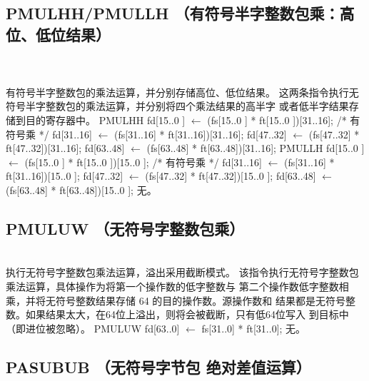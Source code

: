 \subsection{PMULHH/PMULLH （有符号半字整数包乘：高位、低位结果）}

\begin{instructionblk}
   \\
   \\
  {有符号半字整数包的乘法运算，并分别存储高位、低位结果。}
  {这两条指令执行无符号半字整数包的乘法运算，并分别将四个乘法结果的高半字
  或者低半字结果存储到目的寄存器中。}
  {PMULHH \narrownewline
  fd[15..0 ] $\leftarrow$ (fs[15..0 ] * ft[15..0 ])[31..16]; /* 有符号乘 */ \narrownewline
  fd[31..16] $\leftarrow$ (fs[31..16] * ft[31..16])[31..16]; \narrownewline
  fd[47..32] $\leftarrow$ (fs[47..32] * ft[47..32])[31..16]; \narrownewline
  fd[63..48] $\leftarrow$ (fs[63..48] * ft[63..48])[31..16]; \narrownewline \narrownewline
  PMULLH \narrownewline
  fd[15..0 ] $\leftarrow$ (fs[15..0 ] * ft[15..0 ])[15..0 ]; /* 有符号乘 */ \narrownewline
  fd[31..16] $\leftarrow$ (fs[31..16] * ft[31..16])[15..0 ]; \narrownewline
  fd[47..32] $\leftarrow$ (fs[47..32] * ft[47..32])[15..0 ]; \narrownewline
  fd[63..48] $\leftarrow$ (fs[63..48] * ft[63..48])[15..0 ];}
  {无。}
\end{instructionblk}

\subsection{PMULUW （无符号字整数包乘）}

\begin{instructionblk}
   \\
  {执行无符号字整数包乘法运算，溢出采用截断模式。}
  {该指令执行无符号字整数包乘法运算，具体操作为将第一个操作数的低字整数与
  第二个操作数低字整数相乘，并将无符号整数结果存储 64 的目的操作数。源操作数和
  结果都是无符号整数。如果结果太大，在64位上溢出，则将会被截断，只有低64位写入
  到目标中（即进位被忽略）。}
  {PMULUW \narrownewline
  fd[63..0] $\leftarrow$ fs[31..0] * ft[31..0];}
  {无。}
\end{instructionblk}

\subsection{PASUBUB （无符号字节包 绝对差值运算）}

